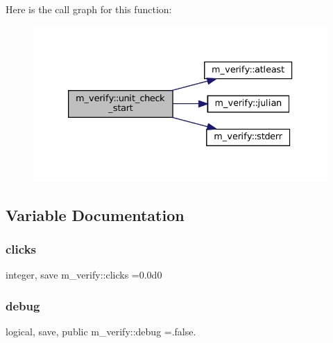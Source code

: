 Here is the call graph for this function\+:\nopagebreak
\begin{figure}[H]
\begin{center}
\leavevmode
\includegraphics[width=333pt]{namespacem__verify_ad753d0a58dbc02c8917bf2b2aa3e1de7_cgraph}
\end{center}
\end{figure}


\subsection{Variable Documentation}
\mbox{\label{namespacem__verify_af97c7f92394811bec5fed506fdfab67d}} 
\subsubsection{\texorpdfstring{clicks}{clicks}}
{\footnotesize\ttfamily integer, save m\+\_\+verify\+::clicks =0.\+0d0\hspace{0.3cm}{\ttfamily [private]}}

\mbox{\label{namespacem__verify_a0f87b43bebf70897f9ec711be3f01839}} 
\subsubsection{\texorpdfstring{debug}{debug}}
{\footnotesize\ttfamily logical, save, public m\+\_\+verify\+::debug =.false.}

\mbox{\label{namespacem__verify_a77729c599fbd8aed6075a05fb3c38146}} 
